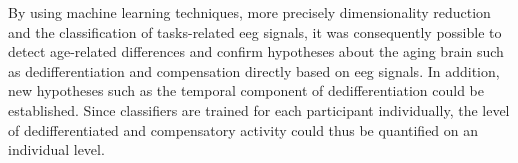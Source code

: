 By using machine learning techniques, more precisely dimensionality reduction and the classification of tasks-related \gls{eeg} signals, it was consequently possible to detect age-related differences and confirm hypotheses about the aging brain such as dedifferentiation and compensation directly based on \gls{eeg} signals. In addition, new hypotheses such as the temporal component of dedifferentiation could be established.  Since classifiers are trained for each participant individually, the level of dedifferentiated and compensatory activity could thus be quantified on an individual level. 